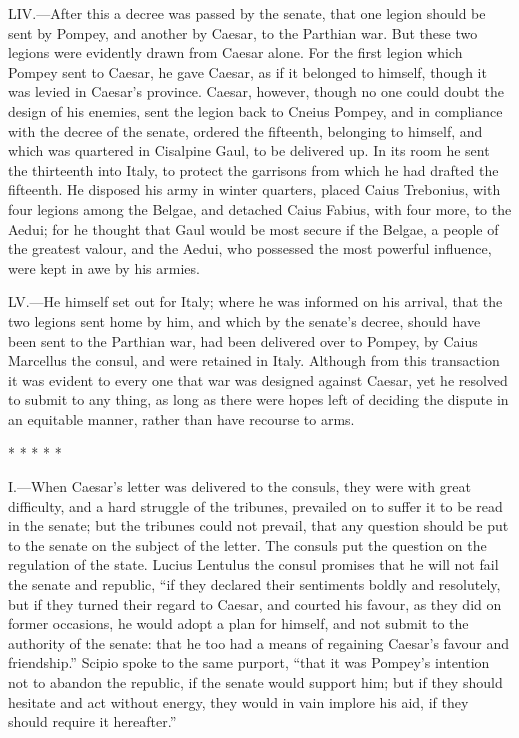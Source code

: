 LIV.—After this a decree was passed by the senate, that one legion
should be sent by Pompey, and another by Caesar, to the Parthian war.
But these two legions were evidently drawn from Caesar alone. For the
first legion which Pompey sent to Caesar, he gave Caesar, as if it
belonged to himself, though it was levied in Caesar's province. Caesar,
however, though no one could doubt the design of his enemies, sent the
legion back to Cneius Pompey, and in compliance with the decree of the
senate, ordered the fifteenth, belonging to himself, and which was
quartered in Cisalpine Gaul, to be delivered up. In its room he sent the
thirteenth into Italy, to protect the garrisons from which he had
drafted the fifteenth. He disposed his army in winter quarters, placed
Caius Trebonius, with four legions among the Belgae, and detached Caius
Fabius, with four more, to the Aedui; for he thought that Gaul would be
most secure if the Belgae, a people of the greatest valour, and the
Aedui, who possessed the most powerful influence, were kept in awe by
his armies.

LV.—He himself set out for Italy; where he was informed on his arrival,
that the two legions sent home by him, and which by the senate's decree,
should have been sent to the Parthian war, had been delivered over to
Pompey, by Caius Marcellus the consul, and were retained in Italy.
Although from this transaction it was evident to every one that war was
designed against Caesar, yet he resolved to submit to any thing, as long
as there were hopes left of deciding the dispute in an equitable manner,
rather than have recourse to arms.

* * * * *


I.—When Caesar's letter was delivered to the consuls, they were with
great difficulty, and a hard struggle of the tribunes, prevailed on to
suffer it to be read in the senate; but the tribunes could not prevail,
that any question should be put to the senate on the subject of the
letter. The consuls put the question on the regulation of the state.
Lucius Lentulus the consul promises that he will not fail the senate and
republic, ``if they declared their sentiments boldly and resolutely, but
if they turned their regard to Caesar, and courted his favour, as they
did on former occasions, he would adopt a plan for himself, and not
submit to the authority of the senate: that he too had a means of
regaining Caesar's favour and friendship.'' Scipio spoke to the same
purport, ``that it was Pompey's intention not to abandon the republic, if
the senate would support him; but if they should hesitate and act
without energy, they would in vain implore his aid, if they should
require it hereafter.''


